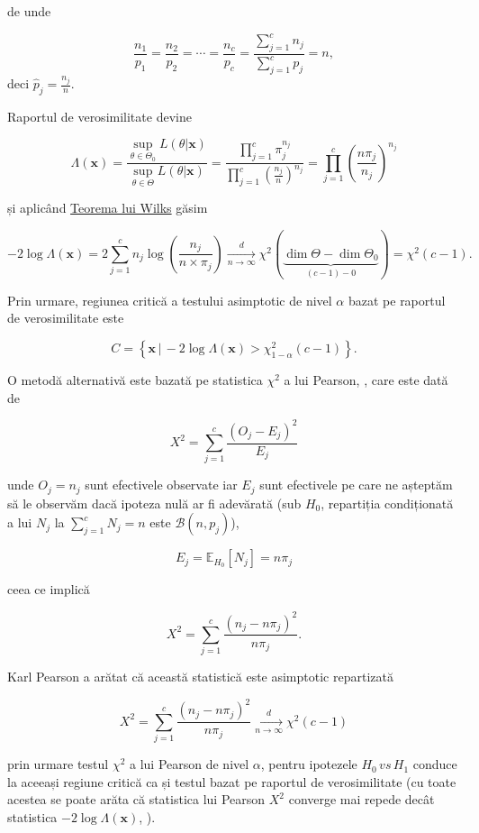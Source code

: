 \documentclass[]{article}
\begin{document}
de unde

\[
  \frac{n_1}{p_1} = \frac{n_2}{p_2} = \cdots = \frac{n_c}{p_c} = \frac{\sum_{j = 1}^{c}n_j}{\sum_{j = 1}^{c}p_j} = n,
\] deci \(\hat{p}_{j} = \frac{n_j}{n}\).

Raportul de verosimilitate devine

\[
\Lambda(\mathbf{x})=\frac{\sup_{\theta\in\Theta_0}L(\theta|\mathbf{x})}{\sup_{\theta\in\Theta}L(\theta|\mathbf{x})} = \frac{\prod_{j = 1}^{c} \pi_{j}^{n_{j}}}{\prod_{j = 1}^{c} \left(\frac{n_{j}}{n}\right)^{n_{j}}} = \prod_{j = 1}^{c}\left(\frac{n\pi_{j}}{n_j}\right)^{n_{j}}
\]

și aplicând
\href{https://en.wikipedia.org/wiki/Likelihood-ratio_test}{Teorema lui
Wilks} găsim

\[
  -2\log \Lambda(\mathbf{x}) = 2\sum_{j = 1}^{c} n_{j}\log\left(\frac{n_{j}}{n\times \pi_{j}}\right) \underset{n\to\infty}{\overset{d}{\longrightarrow}}\chi^2(\underbrace{\dim{\Theta} - \dim{\Theta_0}}_{(c-1)-0}) = \chi^2(c-1).
\]

Prin urmare, regiunea critică a testului asimptotic de nivel \(\alpha\)
bazat pe raportul de verosimilitate este

\[
  C = \left\{\mathbf{x} \,|\, -2\log \Lambda(\mathbf{x}) > \chi^2_{1-\alpha}(c-1)\right\}.
\]

O metodă alternativă este bazată pe statistica \(\chi^2\) a lui Pearson,
\citep{Pearson1900}, care este dată de

\[
  X^2 = \sum_{j = 1}^{c}\frac{(O_{j} - E_{j})^2}{E_{j}}
\]

unde \(O_{j} = n_{j}\) sunt efectivele observate iar \(E_{j}\) sunt
efectivele pe care ne așteptăm să le observăm dacă ipoteza nulă ar fi
adevărată (sub \(H_0\), repartiția condiționată a lui \(N_{j}\) la
\(\sum_{j = 1}^{c}N_{j} = n\) este \(\mathcal{B}(n,p_{j})\)),

\[
  E_{j} = \mathbb{E}_{H_0}[N_{j}] = n \pi_j
\]

ceea ce implică

\[
  X^2 = \sum_{j = 1}^{c}\frac{\left(n_{j} - n \pi_j\right)^2}{n \pi_j}.
\]

Karl Pearson a arătat că această statistică este asimptotic repartizată

\[
  X^2 = \sum_{j = 1}^{c}\frac{\left(n_{j} - n \pi_j\right)^2}{n \pi_j} \underset{n\to\infty}{\overset{d}{\longrightarrow}} \chi^2(c-1)
\]

prin urmare testul \(\chi^2\) a lui Pearson de nivel \(\alpha\), pentru
ipotezele \(H_0\,vs\,H_1\) conduce la aceeași regiune critică ca și
testul bazat pe raportul de verosimilitate (cu toate acestea se poate
arăta că statistica lui Pearson \(X^2\) converge mai repede decât
statistica \(-2\log \Lambda(\mathbf{x})\), \citep{Agresti2012}).
\end{document}
